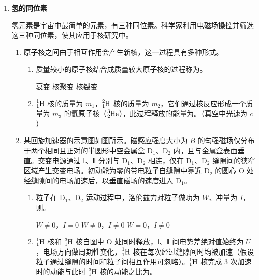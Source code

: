 \documentclass[\gkver]{gaokaozhenti}
\begin{document}
\begin{enumerate}
{彗星在运动过程中满足机械能守恒，有

$\frac{1}{2}mv_{1}^{2} - \frac{GMm}{r_{1}} = \frac{1}{2}mv_{2}^{2} - \frac{GMm}{r_{2}}$

得　$v_{2} = \sqrt{v_{1}^{2} + \frac{2GM}{r_{2}} - \frac{2GM}{r_{1}}}$
}

\item
\textbf{氢的同位素}

氢元素是宇宙中最简单的元素，有三种同位素。科学家利用电磁场操控并筛选这三种同位素，使其应用于核研究中。
\begin{enumerate}
	\item
	原子核之间由于相互作用会产生新核，这一过程具有多种形式。
	\begin{enumerate}
		\item
		质量较小的原子核结合成质量较大原子核的过程称为。

		{衰变}
		{核聚变}
		{核裂变}

		\item
		$\ce{^{1}_{1}H}$ 核的质量为 $m_{1}$，$\ce{^{2}_{1}H}$ 核的质量为 $m_{2}$，它们通过核反应形成一个质量为 $m_{3}$ 的氦原子核（$\ce{^{3}_{2}He}$），此过程释放的能量为。（真空中光速为 $c$）
	\end{enumerate}

	\item
	某回旋加速器的示意图如图所示。磁感应强度大小为 $B$ 的匀强磁场仅分布于两个相同且正对的半圆形中空金属盒 D$_{1}$、D$_{2}$ 内，且与金属盒表面垂直。交变电源通过 Ⅰ、Ⅱ 分别与 D$_{1}$、D$_{2}$ 相连，仅在 D$_{1}$、D$_{2}$ 缝隙间的狭窄区域产生交变电场。初动能为零的带电粒子自缝隙中靠近 D$_{2}$ 的圆心 O 处经缝隙间的电场加速后，以垂直磁场的速度进入 D$_{1}$。

	\onepicture[align=right, w=3.83cm]{}
	\begin{enumerate}
		\item
		粒子在 D$_{1}$、D$_{2}$ 运动过程中，洛伦兹力对粒子做功为 $W$、冲量为 $I$，则。

		{$W \neq 0$，$I = 0$}
		{$W \neq 0$，$I \neq 0$}
		{$W = 0$，$I \neq 0$}

		\item
		$\ce{^{1}_{1}H}$ 核和 $\ce{^{3}_{1}H}$ 核自图中 O 处同时释放，Ⅰ、Ⅱ 间电势差绝对值始终为 $U$，电场方向做周期性变化，$\ce{^{1}_{1}H}$ 核在每次经过缝隙间时均被加速（假设粒子通过缝隙的时间和粒子间相互作用可忽略）。$\ce{^{1}_{1}H}$ 核完成 3 次加速时的动能与此时 $\ce{^{3}_{1}H}$ 核的动能之比为。


\end{enumerate}
\end{enumerate}
\end{enumerate}
\end{document}
